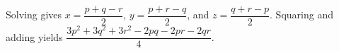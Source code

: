 Solving gives $x=\dfrac{p+q-r}{2}$, $y=\dfrac{p+r-q}{2}$, and $z=\dfrac{q+r-p}{2}$. Squaring and adding yields $\boxed{\dfrac{3p^2+3q^2+3r^2-2pq-2pr-2qr}{4}}$.

